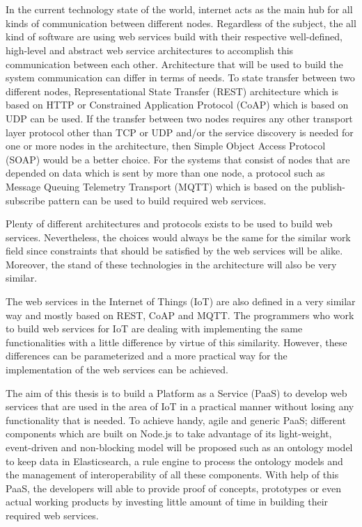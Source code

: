 \chapter{\abstractname}



In the current technology state of the world, internet acts as the main hub for all kinds of communication between different nodes. Regardless of the subject, the all kind of software are using web services build with their respective well-defined, high-level and abstract web service architectures to accomplish this communication between each other. Architecture that will be used to build the system communication can differ in terms of needs. To state transfer between two different nodes, Representational State Transfer (REST) architecture which is based on HTTP or Constrained Application Protocol (CoAP) which is based on UDP can be used. If the transfer between two nodes requires any other transport layer protocol other than TCP or UDP and/or the service discovery is needed for one or more nodes in the architecture, then Simple Object Access Protocol (SOAP) would be a better choice. For the systems that consist of nodes that are depended on data which is sent by more than one node, a protocol such as Message Queuing Telemetry Transport (MQTT) which is based on the publish-subscribe pattern can be used to build required web services.

Plenty of different architectures and protocols exists  to be used to build web services. Nevertheless, the choices would always be the same for the similar work field since constraints that should be satisfied by the web services will be alike. Moreover, the stand of these technologies in the architecture will also be very similar.

The web services in the Internet of Things (IoT) are also defined in a very similar way and mostly based on REST, CoAP and MQTT. The programmers who work to build web services for IoT are dealing with implementing the same functionalities with a little difference by virtue of this similarity. However, these differences can be parameterized and a more practical way for the implementation of the web services can be achieved.

The aim of this thesis is to build a Platform as a Service (PaaS) to develop web services that are used in the area of IoT in a practical manner without losing any functionality that is needed. To achieve handy, agile and generic PaaS; different components which are built on Node.js to take advantage of its light-weight, event-driven and non-blocking model will be proposed such as an ontology model to keep data in Elasticsearch, a rule engine to process the ontology models and the management of interoperability of all these components. With help of this PaaS, the developers will able to provide proof of concepts, prototypes or even actual working products by investing little amount of time in building their required web services.